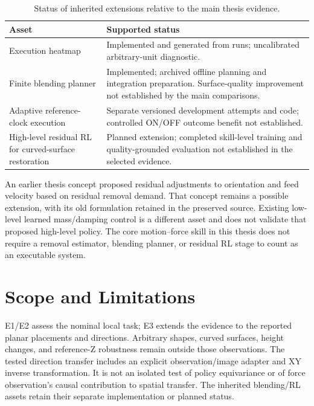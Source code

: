 \begin{table}[tbp]\centering\small
\caption[Status of inherited extensions]{Status of inherited extensions relative to the main thesis evidence.}
\label{tab:extension_status}
\begin{tabularx}{\textwidth}{P{0.32\textwidth}X}
\toprule Asset & Supported status \\ \midrule
Execution heatmap & Implemented and generated from runs; uncalibrated arbitrary-unit diagnostic. \\
Finite blending planner & Implemented; archived offline planning and integration preparation. Surface-quality improvement not established by the main comparisons. \\
Adaptive reference-clock execution & Separate versioned development attempts and code; controlled ON/OFF outcome benefit not established. \\
High-level residual RL for curved-surface restoration & Planned extension; completed skill-level training and quality-grounded evaluation not established in the selected evidence. \\
\bottomrule
\end{tabularx}
\end{table}

An earlier thesis concept proposed residual adjustments to orientation and feed velocity based on residual removal demand. That concept remains a possible extension, with its old formulation retained in the preserved source. Existing low-level learned mass/damping control is a different asset and does not validate that proposed high-level policy. The core motion--force skill in this thesis does not require a removal estimator, blending planner, or residual RL stage to count as an executable system.

\section{Scope and Limitations}
E1/E2 assess the nominal local task; E3 extends the evidence to the reported planar placements and directions. Arbitrary shapes, curved surfaces, height changes, and reference-Z robustness remain outside those observations. The tested direction transfer includes an explicit observation/image adapter and XY inverse transformation. It is not an isolated test of policy equivariance or of force observation's causal contribution to spatial transfer. The inherited blending/RL assets retain their separate implementation or planned status.

